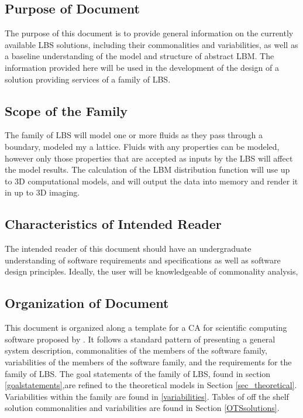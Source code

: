 \documentclass[12pt]{article}
\begin{document}
\subsection{Purpose of Document}

The purpose of this document is to provide general information on the currently available LBS solutions, including their commonalities and variabilities, as well as a baseline understanding of the model and structure of abstract LBM. The information provided here will be used in the development of the design of a solution providing services of a family of LBS.

\subsection{Scope of the Family} 

The family of LBS will model one or more fluids as they pass through a boundary, modeled my a lattice. Fluids with any properties can be modeled, however only those properties that are accepted as inputs by the LBS will affect the model results. The calculation of the LBM distribution function will use up to 3D computational models, and will output the data into memory and render it in up to 3D imaging.

\subsection{Characteristics of Intended Reader} 

The intended reader of this document should have an undergraduate understanding of software requirements and specifications as well as software design principles. Ideally, the user will be knowledgeable of commonality analysis, 

\subsection{Organization of Document}

This document is organized along a template for a CA for scientific computing software proposed by \citet{smith2006systematic}. It follows a standard pattern of presenting a general system description, commonalities of the members of the software family, variabilities of the members of the software family, and the requirements for the family of LBS. The goal statements of the family of LBS, found in section \ref{goalstatements},are refined to the theoretical models in Section \ref{sec_theoretical}. Variabilities within the family are found in \ref{variabilities}. Tables of off the shelf solution commonalities and variabilities are found in Section \ref{OTSsolutions}.
\end{document}
